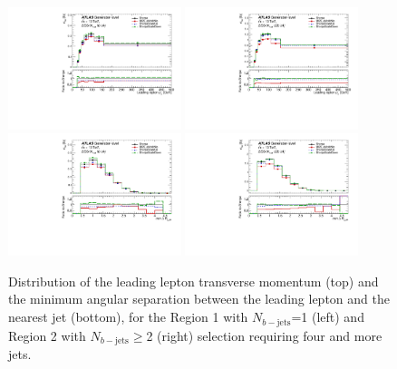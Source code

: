 \begin{figure}[!htb]
\centering
\includegraphics[width=0.45\textwidth]{Plots/ttV/generator/c_Region_0_lep_Pt_0}
\includegraphics[width=0.45\textwidth]{Plots/ttV/generator/c_Region_1_lep_Pt_0}\\
\includegraphics[width=0.45\textwidth]{Plots/ttV/generator/c_Region_0_min_DRl0j}
\includegraphics[width=0.45\textwidth]{Plots/ttV/generator/c_Region_1_min_DRl0j}\\
  \caption{Distribution of the leading lepton transverse momentum (top) and the minimum angular separation between the leading lepton and the nearest jet (bottom), for the Region 1 with $N_{b-\mathrm{jets}}$=1 (left) and Region 2 with $N_{b-\mathrm{jets}}\geq$2 (right) selection requiring four and more jets. 
  \label{ttV:den_lep_kin}}
\end{figure}

